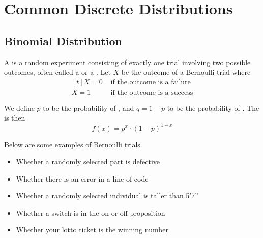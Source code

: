 \section{Common Discrete Distributions}

\subsection{Binomial Distribution}

\begin{definition}
    A  is a random experiment consisting of exactly one trial involving two possible outcomes, often called a  or a . Let $X$ be the outcome of a Bernoulli trial where 
    $$\begin{aligned}[t]
        X = 0 & \text{ if the outcome is a failure} \\
        X = 1 & \text{ if the outcome is a success}
    \end{aligned}$$

    We define $p$ to be the probability of , and $q = 1 - p$ to be the probability of . The  is then $$f(x) = p^x \cdot (1 - p)^{1 - x}$$
\end{definition}

\begin{example}
    Below are some examples of Bernoulli trials. 

    \begin{itemize}
        \item Whether a randomly selected part is defective 
        \item Whether there is an error in a line of code 
        \item Whether a randomly selected individual is taller than 5'7'' 
        \item Whether a switch is in the on or off proposition
        \item Whether your lotto ticket is the winning number
    \end{itemize}
\end{example}

